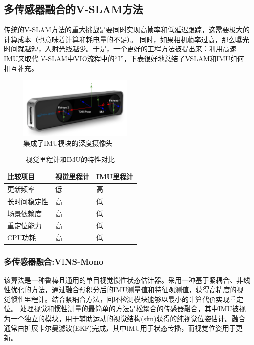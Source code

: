 \documentclass[cs4size,a4paper]{ctexart}
\numberwithin{equation}{section}
\numberwithin{table}{section}
\numberwithin{figure}{section}
\begin{document}
\subsection{多传感器融合的V-SLAM方法}
传统的V-SLAM方法的重大挑战是要同时实现高帧率和低延迟跟踪，这需要极大的计算成本（也意味着计算和耗电量的不足）。
同时，如果相机帧率过高，那么曝光时间就越短，入射光线越少。于是，一个更好的工程方法被提出来：利用高速IMU来取代
V-SLAM中VIO流程中的“I”，下表很好地总结了VSLAM和IMU如何相互补充。
\begin{figure}[H]
        \centering
        \includegraphics[width=0.5\textwidth]{figure/imu.png}
        \caption{集成了IMU模块的深度摄像头}
\end{figure}
\begin{table}[H]
        \centering
        \begin{tabular}{l|ll}
        \toprule
        比较项目   &视觉里程计 & IMU里程计\\
        \midrule[2pt]
        更新频率 & 低    & 高\\
        长时间稳定性 & 高   & 低\\
        场景依赖度 & 高  &  低\\
        重定位能力 &  高  & 低\\
        CPU功耗 &  高 & 低\\
        \bottomrule
        \end{tabular}
        \caption{视觉里程计和IMU的特性对比}
\end{table}

\subsubsection{多传感器融合:VINS-Mono}
该算法\cite{8421746}是一种鲁棒且通用的单目视觉惯性状态估计器。采用一种基于紧耦合、非线性优化的方法，通过融合预积分后的IMU测量值和特征观测值，获得高精度的视觉惯性里程计。结合紧耦合方法，回环检测模块能够以最小的计算代价实现重定位。
处理视觉和惯性测量的最简单的方法是松耦合的传感器融合\cite{8576618,8630025}，其中IMU被视为一个独立的模块，用于辅助运动的视觉结构(sfm)获得的纯视觉位姿估计。融合通常由扩展卡尔曼滤波(EKF)完成，其中IMU用于状态传播，而视觉位姿用于更新。
  
\end{document}
